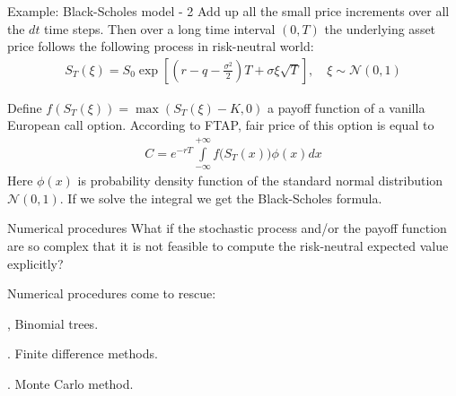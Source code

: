 \documentclass{beamer}
\begin{document}
\begin{frame}{Example: Black-Scholes model - 2}
\justify
Add up all the small price increments over all the $dt$ time steps. Then over a long time interval $(0, T)$ the underlying asset price follows the following process in risk-neutral world:
\begin{align*}
S_T(\xi) = S_0\exp{\left[\left(r - q - \frac{\sigma^2}{2}\right)T + \sigma\xi\sqrt{T}\right]}, \quad \xi \sim \mathcal{N}(0, 1)
\end{align*}

\justify
Define $f(S_T(\xi)) = \max(S_T(\xi) - K, 0)$ a payoff function of a vanilla European call option. According to FTAP, fair price of this option is equal to
\begin{align*}
C = e^{-rT} \int\limits_{-\infty}^{+\infty}f\Big(S_T(x)\Big)\phi(x)dx
\end{align*}
Here $\phi(x)$ is probability density function of the standard normal distribution $\mathcal{N}(0,1)$. If we solve the integral we get the Black-Scholes formula.
\end{frame}



\begin{frame}{Numerical procedures}
\justify
What if the stochastic process and/or the payoff function are so complex that it is not feasible to compute the risk-neutral expected value explicitly?

\justify
Numerical procedures come to rescue:

, Binomial trees.

. Finite difference methods.

. Monte Carlo method.
\end{frame}
\end{document}
